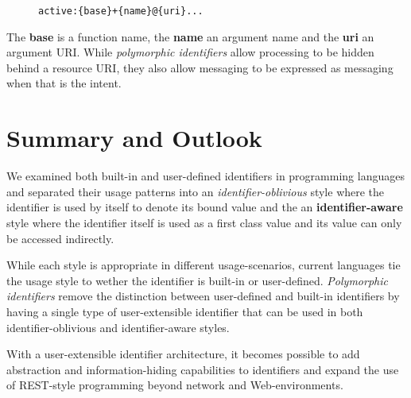 \documentclass[preprint,authoryear]{acm_proc_article-sp}
\begin{document}
\begin{figure}[htbp]
\begin{lstlisting}[style=L,label= activeuri,caption=Active URI.]
  active:{base}+{name}@{uri}...
\end{lstlisting}
\end{figure}

The {\bf base} is a function name, the {\bf name} an argument name and the
{\bf uri} an argument URI.
 While \emph{polymorphic identifiers} allow processing to be
hidden behind a resource URI, they also allow messaging to be expressed
as messaging when that is the intent.


\section{Summary and Outlook}
\label{summary-and-outlook}

We examined both built-in and user-defined identifiers in programming languages 
and separated their usage patterns into an {\em identifier-oblivious} style where
the identifier is used by itself to denote its bound value and the 
an {\bf identifier-aware} style where the identifier itself is used as a first class value
and its value can only be accessed indirectly.

While each style is appropriate in different usage-scenarios, current languages 
tie the usage style to wether the identifier is built-in or user-defined.  \emph{Polymorphic
identifiers} remove the distinction between user-defined and built-in identifiers by having
a single type of user-extensible identifier that can be used in both identifier-oblivious
and identifier-aware styles.

With a user-extensible identifier architecture, it becomes possible to add abstraction
and information-hiding capabilities to identifiers and expand the use of REST-style
programming beyond network and Web-environments.







\vfill
\break





\balancecolumns
\end{document}

